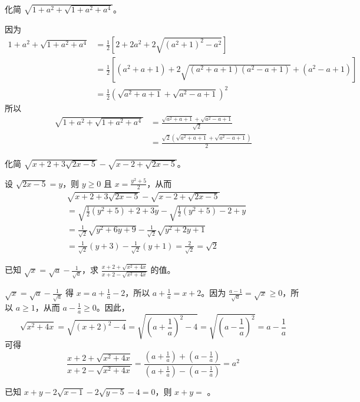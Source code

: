 \begin{questions}
\question 化简 $\sqrt{1+a^2+\sqrt{1+a^2+a^4}}$。
\begin{solution}
因为
\begin{align*}
1+a^2+\sqrt{1+a^2+a^4} &= \frac{1}{2}\left[2+2a^2+2\sqrt{\left(a^2+1\right)^2-a^2}\right] \\
&= \frac{1}{2}\left[\left(a^2+a+1\right)+2\sqrt{\left(a^2+a+1\right)\left(a^2-a+1\right)}+\left(a^2-a+1\right)\right] \\
&= \frac{1}{2}\left(\sqrt{a^2+a+1}+\sqrt{a^2-a+1}\right)^2
\end{align*}
所以
\begin{align*}
\sqrt{1+a^2+\sqrt{1+a^2+a^4}} &= \frac{\sqrt{a^2+a+1}+\sqrt{a^2-a+1}}{\sqrt{2}} \\
&= \frac{\sqrt{2}\left(\sqrt{a^2+a+1}+\sqrt{a^2-a+1}\right)}{2}
\end{align*}
\end{solution}

\question 化简 $\sqrt{x+2+3\sqrt{2x-5}}-\sqrt{x-2+\sqrt{2x-5}}$。
\begin{solution}
设 $\sqrt{2x-5}=y$，则 $y \ge 0$ 且 $x=\frac{y^2+5}{2}$，从而
\begin{align*}
&\sqrt{x+2+3\sqrt{2x-5}}-\sqrt{x-2+\sqrt{2x-5}} \\
&= \sqrt{\frac{1}{2}\left(y^2+5\right)+2+3y}-\sqrt{\frac{1}{2}\left(y^2+5\right)-2+y} \\
&= \frac{1}{\sqrt{2}}\sqrt{y^2+6y+9}-\frac{1}{\sqrt{2}}\sqrt{y^2+2y+1} \\
&= \frac{1}{\sqrt{2}}\left(y+3\right)-\frac{1}{\sqrt{2}}\left(y+1\right)=\frac{2}{\sqrt{2}}=\sqrt{2}
\end{align*}
\end{solution}

\question 已知 $\sqrt{x}=\sqrt{a}-\frac{1}{\sqrt{a}}$，求 $\frac{x+2+\sqrt{x^2+4x}}{x+2-\sqrt{x^2+4x}}$ 的值。
\begin{solution}
$\sqrt{x}=\sqrt{a}-\frac{1}{\sqrt{a}}$ 得 $x=a+\frac{1}{a}-2$，所以 $a+\frac{1}{a}=x+2$。因为 $\frac{a-1}{\sqrt{a}}=\sqrt{x} \ge 0$，所以 $a \ge 1$，从而 $a-\frac{1}{a} \ge 0$。因此，
\[
\sqrt{x^2+4x}=\sqrt{\left(x+2\right)^2-4}=\sqrt{\left(a+\frac{1}{a}\right)^2-4}=\sqrt{\left(a-\frac{1}{a}\right)^2}=a-\frac{1}{a}
\]
可得
\[
\frac{x+2+\sqrt{x^2+4x}}{x+2-\sqrt{x^2+4x}}=\frac{\left(a+\frac{1}{a}\right)+\left(a-\frac{1}{a}\right)}{\left(a+\frac{1}{a}\right)-\left(a-\frac{1}{a}\right)}=a^2
\]
\end{solution}

\question 已知 $x + y - 2\sqrt{x - 1} - 2\sqrt{y - 5} - 4 = 0$，则 $x + y =$ \underline{\hspace{1cm}}。


\end{questions}
